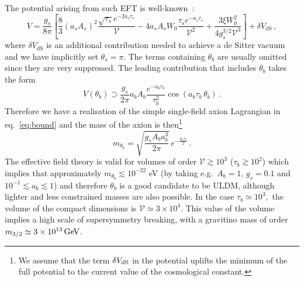 \documentclass[11pt,a4paper]{article}
\newcommand{\V}{\mathcal{V}}
\begin{document}
The potential arising from such EFT is well-known~\cite{Balasubramanian:2005zx,Conlon:2005ki}:
\begin{equation}
V = \frac{g_s}{8 \pi} \left[\frac{8}{3} \left(a_s A_s\right)^2 \frac{\sqrt{\tau_s} e^{-2 a_s \tau_s}}{\V} - 4 a_s A_s W_0 \frac{\tau_s e^{-a_s \tau_s}}{\mathcal{V}^2} + \frac{3 \xi W_0^2}{4 g_s^{3/2} \mathcal{V}^3}\right] + \delta V_{\text{dS}} \,,
\end{equation}
where $\delta V_{\text{dS}}$ is an additional contribution needed to achieve a de Sitter vacuum and we have implicitly set $\theta_s = \pi$. The terms containing $\theta_b$ are usually omitted since they are very suppressed. The leading contribution that includes $\theta_b$ takes the form
\begin{equation}
V(\theta_b) \supset \frac{g_s}{2 \pi} a_b A_b \frac{e^{-a_b \tau_b}}{\tau_b^2} \cos\left(a_b \tau_b\, \theta_b\right) \,.
\end{equation} 
Therefore we have a realisation of the simple single-field axion Lagrangian in eq.~\eqref{eq:bound} and the mass of the axion is then\footnote{We assume that the term $\delta V_{\rm dS}$ in the potential uplifts the minimum of the full potential to the current value of the cosmological constant.}
\begin{equation}
\label{eq:VolumeAxionMass}
m_{\theta_b} = \sqrt{\frac{g_s A_b a_b^3}{2 \pi}} \, {e^{- \frac{a_b \tau_b}{2}}} \,.
\end{equation}
The effective field theory is valid for volumes of order  $\mathcal{V} \gtrsim 10^3$ ($\tau_b\gtrsim 10^2$) which implies that approximately $m_{\theta_b}\lesssim 10^{-22}$ eV (by taking e.g.~$A_b = 1$, $g_s = 0.1$ and $10^{-1} \lesssim a_b \lesssim 1$) and therefore $\theta_b$ is a good candidate to be ULDM, although lighter and less constrained masses are also possible. In the case $\tau_b \simeq 10^3,$ the volume of the compact dimensions is $\V \simeq 3 \times 10^4$. This value of the volume implies a high scale of supersymmetry breaking, with a gravitino mass of order $m_{3/2} \simeq 3 \times 10^{13} \, \rm GeV$. 
\end{document}
